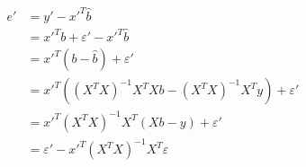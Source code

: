 \documentclass[10pt]{article}
\begin{document}
\begin{align*}\begin{split}
e' &= y' - x'^T \hat{b} \\
   &= x'^T b + \varepsilon' - x'^T\hat{b} \\
   &= x'^T \left(b - \hat{b}\right) + \varepsilon' \\
   &= x'^T \left( \left(X^T X\right)^{-1} X^T X b - \left(X^T X\right)^{-1} X^T y\right) + \varepsilon' \\
   &= x'^T \left(X^T X\right)^{-1} X^T \left(X b - y\right) + \varepsilon' \\
   &= \varepsilon' - x'^T \left( X^T X \right)^{-1} X^T \varepsilon \\
\end{split}\end{align*}
\end{document}
